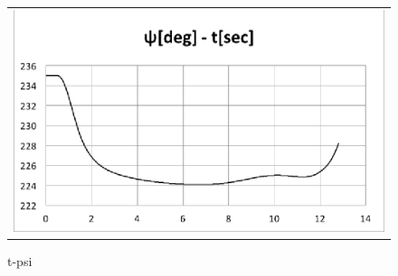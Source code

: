 \documentclass[a4paper]{jarticle}
\begin{document}
\begin{figure}[H]
  \begin{tabular}{c}
    \centering
    \begin{minipage}{0.45\hsize}
      \includegraphics[scale=0.55]{./psi.eps}
      \caption{t-psi}
    \end{minipage} 
  \end{tabular}
\end{figure}
\end{document}
